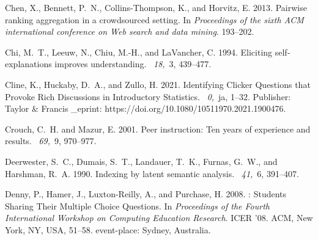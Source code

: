 \documentclass[notitlepage,12pt]{jedm}
\begin{document}
\begin{thebibliography}{}
{\sc Chen, X.}, {\sc Bennett, P.~N.}, {\sc Collins-Thompson, K.}, {\sc and}
  {\sc Horvitz, E.} 2013.
\newblock Pairwise ranking aggregation in a crowdsourced setting.
\newblock In {\em Proceedings of the sixth {ACM} international conference on
  {Web} search and data mining}. 193--202.

{\sc Chi, M.~T.}, {\sc Leeuw, N.}, {\sc Chiu, M.-H.}, {\sc and} {\sc LaVancher,
  C.} 1994.
\newblock Eliciting self‐explanations improves understanding.
~{\em 18,\/}~3, 439--477.

{\sc Cline, K.}, {\sc Huckaby, D.~A.}, {\sc and} {\sc Zullo, H.} 2021.
\newblock Identifying {Clicker} {Questions} that {Provoke} {Rich} {Discussions}
  in {Introductory} {Statistics}.
~{\em 0,\/}~ja, 1--32.
\newblock Publisher: Taylor \& Francis \_eprint:
  https://doi.org/10.1080/10511970.2021.1900476.

{\sc Crouch, C.~H.} {\sc and} {\sc Mazur, E.} 2001.
\newblock Peer instruction: {Ten} years of experience and results.
~{\em 69,\/}~9, 970--977.

{\sc Deerwester, S.~C.}, {\sc Dumais, S.~T.}, {\sc Landauer, T.~K.}, {\sc
  Furnas, G.~W.}, {\sc and} {\sc Harshman, R.~A.} 1990.
\newblock Indexing by latent semantic analysis.
~{\em 41,\/}~6, 391--407.

{\sc Denny, P.}, {\sc Hamer, J.}, {\sc Luxton-Reilly, A.}, {\sc and} {\sc
  Purchase, H.} 2008.
: {Students} {Sharing} {Their} {Multiple} {Choice}
  {Questions}.
\newblock In {\em Proceedings of the {Fourth} {International} {Workshop} on
  {Computing} {Education} {Research}}. {ICER} '08. ACM, New York, NY, USA,
  51--58.
\newblock event-place: Sydney, Australia.


\end{thebibliography}
\end{document}
